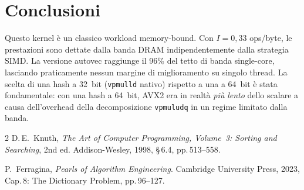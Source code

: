 \documentclass[10pt,a4paper,twocolumn]{article}
\begin{document}
\section{Conclusioni}

Questo kernel è un classico workload memory-bound. Con $I\!=\!0{,}33$ ops/byte, le prestazioni sono dettate dalla banda DRAM indipendentemente dalla strategia SIMD. La versione autovec raggiunge il 96\% del tetto di banda single-core, lasciando praticamente nessun margine di miglioramento su singolo thread. La scelta di una hash a 32~bit (\texttt{vpmulld} nativo) rispetto a una a 64~bit è stata fondamentale: con una hash a 64~bit, AVX2 era in realtà \emph{più lento} dello scalare a causa dell'overhead della decomposizione \texttt{vpmuludq} in un regime limitato dalla banda.

\begin{thebibliography}{2}
D.\,E.~Knuth, \textit{The Art of Computer Programming, Volume~3: Sorting and Searching}, 2nd ed. Addison-Wesley, 1998, \S\,6.4, pp.\,513--558.

P.~Ferragina, \textit{Pearls of Algorithm Engineering}. Cambridge University Press, 2023, Cap.\,8: The Dictionary Problem, pp.\,96--127.
\end{thebibliography}
\end{document}
